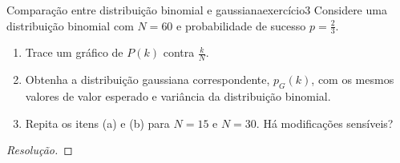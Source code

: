 \begin{exercício}{Comparação entre distribuição binomial e gaussiana}{exercício3}
    Considere uma distribuição binomial com \(N = 60\) e probabilidade de sucesso \(p = \frac23\).
    \begin{enumerate}[label=(\alph*)]
        \item Trace um gráfico de \(P(k)\) contra \(\frac{k}{N}\).
        \item Obtenha a distribuição gaussiana correspondente, \(p_G(k)\), com os mesmos valores de valor esperado e variância da distribuição binomial.
        \item Repita os itens (a) e (b) para \(N = 15\) e \(N = 30\). Há modificações sensíveis?
    \end{enumerate}
\end{exercício}
\begin{proof}[Resolução]

\end{proof}
